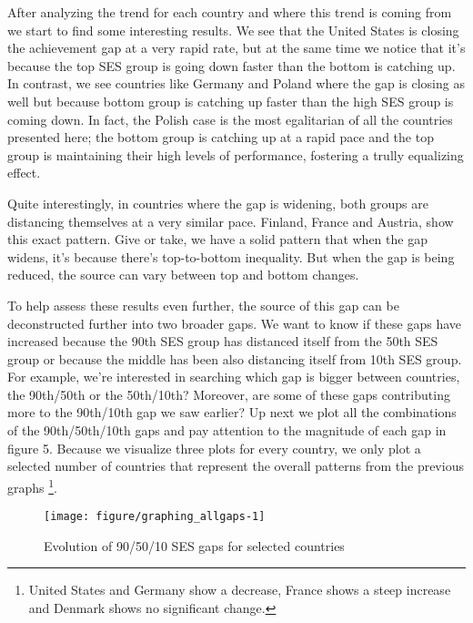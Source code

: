 \documentclass[11pt, a4paper]{article}\usepackage[]{graphicx}\usepackage[]{color}
\begin{document}
After analyzing the trend for each country and where this trend is coming from we start to find some interesting results. We see that the United States is closing the achievement gap at a very rapid rate, but at the same time we notice that it's because the top SES group is going down faster than the bottom is catching up. In contrast, we see countries like Germany and Poland where the gap is closing as well but because bottom group is catching up faster than the high SES group is coming down. In fact, the Polish case is the most egalitarian of all the countries presented here; the bottom group is catching up at a rapid pace and the top group is maintaining their high levels of performance, fostering a trully equalizing effect.

Quite interestingly, in countries where the gap is widening, both groups are distancing themselves at a very similar pace. Finland, France and Austria, show this exact pattern. Give or take, we have a solid pattern that when the gap widens, it's because there's top-to-bottom inequality. But when the gap is being reduced, the source can vary between top and bottom changes.

To help assess these results even further, the source of this gap can be deconstructed further into two broader gaps. We want to know if these gaps have increased because the 90th SES group has distanced itself from the 50th SES group or because the middle has been also distancing itself from 10th SES group. For example, we're interested in searching which gap is bigger between countries, the 90th/50th or the 50th/10th? Moreover, are some of these gaps contributing more to the 90th/10th gap we saw earlier? Up next we plot all the combinations of the 90th/50th/10th gaps and pay attention to the magnitude of each gap in figure 5. Because we visualize three plots for every country, we only plot a selected number of countries that represent the overall patterns from the previous graphs \footnote{United States and Germany show a decrease, France shows a steep increase and Denmark shows no significant change.}.

\begin{figure}

{\centering \texttt{[image: figure/graphing\_allgaps-1]} 

}

\caption[Evolution of 90/50/10 SES gaps for selected countries]{Evolution of 90/50/10 SES gaps for selected countries}\label{fig:graphing_allgaps}
\end{figure}
\end{document}

